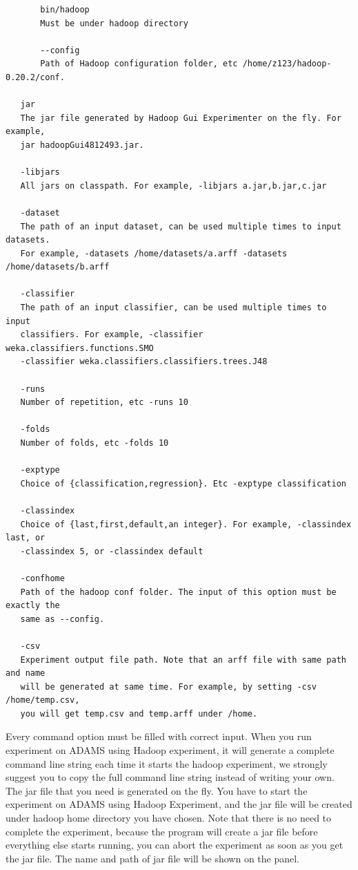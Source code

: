 \documentclass[a4paper]{book}
\begin{document}
{\scriptsize
\begin{verbatim}
	   bin/hadoop	    
	   Must be under hadoop directory
	   
	   --config    		
	   Path of Hadoop configuration folder, etc /home/z123/hadoop-0.20.2/conf.
	   					        		
   jar         		  
   The jar file generated by Hadoop Gui Experimenter on the fly. For example,
   jar hadoopGui4812493.jar.
       
   -libjars    		  
   All jars on classpath. For example, -libjars a.jar,b.jar,c.jar

   -dataset		      
   The path of an input dataset, can be used multiple times to input datasets.
   For example, -datasets /home/datasets/a.arff -datasets /home/datasets/b.arff
       					 
   -classifier 	      
   The path of an input classifier, can be used multiple times to input
   classifiers. For example, -classifier weka.classifiers.functions.SMO
   -classifier weka.classifiers.classifiers.trees.J48
       
   -runs			  	
   Number of repetition, etc -runs 10
       
   -folds			  	
   Number of folds, etc -folds 10
       
   -exptype			  	
   Choice of {classification,regression}. Etc -exptype classification
       
   -classindex		  	
   Choice of {last,first,default,an integer}. For example, -classindex last, or
   -classindex 5, or -classindex default
       					
   -confhome			
   Path of the hadoop conf folder. The input of this option must be exactly the
   same as --config.
       
   -csv					
   Experiment output file path. Note that an arff file with same path and name
   will be generated at same time. For example, by setting -csv /home/temp.csv,
   you will get temp.csv and temp.arff under /home.
\end{verbatim}
}
\noindent Every command option must be filled with correct input. When you run
experiment on ADAMS using Hadoop experiment, it will generate a complete command line string each time it starts
the hadoop experiment, we strongly suggest you to copy the full command line 
string instead of writing your own.\\

\noindent The jar file that you need is generated on the fly. You have to start
the experiment on ADAMS using Hadoop Experiment, and the jar file will be created under hadoop
home directory you have chosen. Note that there is no need to complete 
the experiment, because the program will create a jar file before everything
else starts running, you can abort the experiment as soon as you get the jar file.
The name and path of jar file will be shown on the panel.\\
\end{document}
